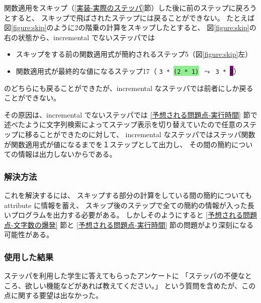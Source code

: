 関数適用をスキップ（\ref{実装-実際のステッパ}節）した後に前のステップに戻ろうとすると、
スキップで飛ばされたステップには戻ることができない。
たとえば図\ref{figure:skip}のように2の階乗の計算をスキップしたとすると、
図\ref{figure:skip}の右の状態から、incremental でないステッパでは
\begin{itemize}
\item スキップをする前の関数適用式が簡約されるステップ5（図\ref{figure:skip}左）
\item 関数適用式が最終的な値になるステップ17（
\texttt{3 * \colorbox{lightgreen}{(2 * 1)} $\leadsto$ 3 * \colorbox{purple}{2}}）
\end{itemize}
のどちらにも戻ることができたが、incremental なステッパでは前者にしか戻ることができない。

その原因は、incremental でないステッパでは \ref{予想される問題点-実行時間}
節で述べたように文字列検索によってステップ表示を切り替えていたので任意のステップに移ることができたのに対して、
incremental なステッパではステッパ関数が関数適用式が値になるまでを１ステップとして出力し、
その間の簡約についての情報は出力しないからである。

\subsubsection{解決方法}

これを解決するには、
スキップする部分の計算をしている間の簡約についても attribute に情報を蓄え、
スキップ後のステップで全ての簡約の情報が入った長いプログラムを出力する必要がある。
しかしそのようにすると
\ref{予想される問題点-文字数の爆発} 節と
\ref{予想される問題点-実行時間} 節の問題がより深刻になる可能性がある。

\subsubsection{使用した結果}

ステッパを利用した学生に答えてもらったアンケートに
「ステッパの不便なところ、欲しい機能などがあれば教えてください。」
という質問を含めたが、この点に関する要望は出なかった。
